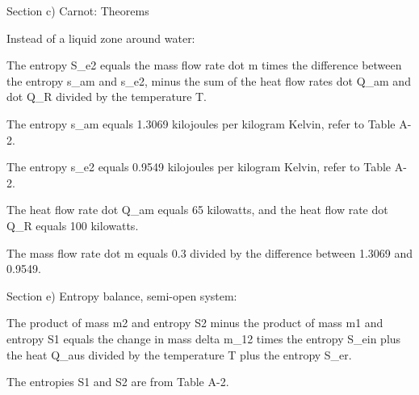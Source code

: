 Section c) Carnot: Theorems

Instead of a liquid zone around water:

The entropy S_e2 equals the mass flow rate dot m times the difference between the entropy s_am and s_e2, minus the sum of the heat flow rates dot Q_am and dot Q_R divided by the temperature T.

The entropy s_am equals 1.3069 kilojoules per kilogram Kelvin, refer to Table A-2.

The entropy s_e2 equals 0.9549 kilojoules per kilogram Kelvin, refer to Table A-2.

The heat flow rate dot Q_am equals 65 kilowatts, and the heat flow rate dot Q_R equals 100 kilowatts.

The mass flow rate dot m equals 0.3 divided by the difference between 1.3069 and 0.9549.

Section e) Entropy balance, semi-open system:

The product of mass m2 and entropy S2 minus the product of mass m1 and entropy S1 equals the change in mass delta m_12 times the entropy S_ein plus the heat Q_aus divided by the temperature T plus the entropy S_er.

The entropies S1 and S2 are from Table A-2.
